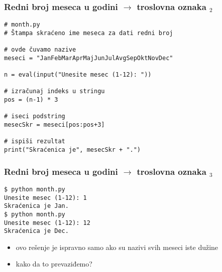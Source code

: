 \documentclass[utf8,compress]{beamer}
\begin{document}

\begin{frame}[fragile,shrink=10]
  \frametitle{Redni broj meseca u godini $\rightarrow$ troslovna oznaka $_2$}
\begin{verbatim}
# month.py
# Štampa skraćeno ime meseca za dati redni broj

# ovde čuvamo nazive
meseci = "JanFebMarAprMajJunJulAvgSepOktNovDec"

n = eval(input("Unesite mesec (1-12): "))

# izračunaj indeks u stringu
pos = (n-1) * 3

# iseci podstring
mesecSkr = meseci[pos:pos+3]

# ispiši rezultat
print("Skraćenica je", mesecSkr + ".")
\end{verbatim}
\end{frame}

\begin{frame}[fragile]
  \frametitle{Redni broj meseca u godini $\rightarrow$ troslovna oznaka $_3$}
\begin{verbatim}
$ python month.py
Unesite mesec (1-12): 1
Skraćenica je Jan.
$ python month.py
Unesite mesec (1-12): 12
Skraćenica je Dec.
\end{verbatim}
  \begin{itemize}
    \item ovo rešenje je ispravno samo ako su nazivi svih meseci iste dužine
    \item kako da to prevaziđemo?
  \end{itemize}
\end{frame}
\end{document}
